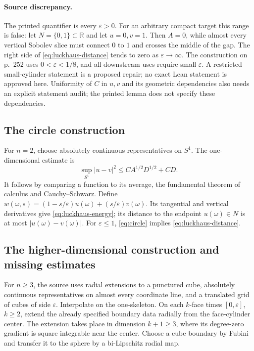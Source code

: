 \documentclass[11pt,a4paper]{article}
\numberwithin{equation}{section}
\theoremstyle{definition}
\theoremstyle{remark}
\newcommand{\R}{\mathbb R}
\begin{document}
\paragraph{Source discrepancy.}
The printed quantifier is every $\varepsilon>0$. For an arbitrary compact
target this range is false: let $N=\{0,1\}\subset\R$ and let $u=0,v=1$.
Then $A=0$, while almost every vertical Sobolev slice must connect $0$ to
$1$ and crosses the middle of the gap. The right side of
\eqref{eq:luckhaus-distance} tends to zero as $\varepsilon\to\infty$.
The construction on p.~252 uses $0<\varepsilon<1/8$, and all downstream
uses require small $\varepsilon$. A restricted small-cylinder statement is
a proposed repair; no exact Lean statement is approved here. Uniformity of
$C$ in $u,v$ and its geometric dependencies also needs an explicit statement
audit; the printed lemma does not specify these dependencies.

\subsection{The circle construction}\label{step:luckhaus-circle}
For $n=2$, choose absolutely continuous representatives on $S^1$. The
one-dimensional estimate is
\begin{equation}\label{eq:circle}
 \sup_{S^1}|u-v|^2\le C A^{1/2}D^{1/2}+CD.
\end{equation}
It follows by comparing a function to its average, the fundamental theorem
of calculus and Cauchy--Schwarz. Define
$w(\omega,s)=(1-s/\varepsilon)u(\omega)+(s/\varepsilon)v(\omega)$.
Its tangential and vertical derivatives give
\eqref{eq:luckhaus-energy}; its distance to the endpoint $u(\omega)\in N$
is at most $|u(\omega)-v(\omega)|$. For $\varepsilon\le1$,
\eqref{eq:circle} implies \eqref{eq:luckhaus-distance}.

\subsection{The higher-dimensional construction and missing estimates}
\label{step:luckhaus-skeleton}
For $n\ge3$, the source uses radial extensions to a punctured cube,
absolutely continuous representatives on almost every coordinate line,
and a translated grid of cubes of side $\varepsilon$. Interpolate on the
one-skeleton. On each $k$-face times $[0,\varepsilon]$, $k\ge2$, extend
the already specified boundary data radially from the face-cylinder center.
The extension takes place in dimension $k+1\ge3$, where its degree-zero
gradient is square integrable near the center. Choose a cube boundary by
Fubini and transfer it to the sphere by a bi-Lipschitz radial map.
\end{document}
